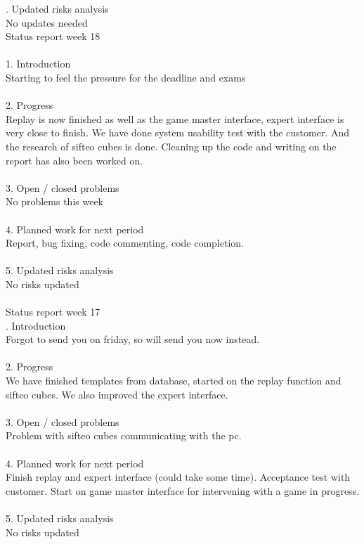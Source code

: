. Updated risks analysis\\
No updates needed\\
\noindent Status report week 18\\
\\
1. Introduction\\
Starting to feel the pressure for the deadline and exams\\
\\
2. Progress\\
Replay is now finished as well as the game master interface, expert interface is very close to finish. We have done system usability test with the customer. And the research of sifteo cubes is done. Cleaning up the code and writing on the report has also been worked on.\\
\\
3. Open / closed problems\\
No problems this week\\
\\
4. Planned work for next period\\
Report, bug fixing, code commenting, code completion.\\
\\
5. Updated risks analysis\\
No risks updated\\
\\
Status report week 17\\

. Introduction\\
Forgot to send you on friday, so will send you now instead.\\
\\
2. Progress\\
We have finished templates from database, started on the replay function and sifteo cubes. We also improved the expert interface.\\
\\
3. Open / closed problems\\
Problem with sifteo cubes communicating with the pc.\\
\\
4. Planned work for next period\\
Finish replay and expert interface (could take some time). Acceptance test with customer. Start on game master interface for intervening with a game in progress.\\
\\
5. Updated risks analysis\\
No risks updated\\


